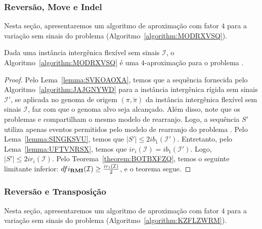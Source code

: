 \subsubsection{Reversão, Move e Indel}

Nesta seção, apresentaremos um algoritmo de aproximação com fator $4$ para a variação sem sinais do problema \SbFIRMI{} (Algoritmo~\ref{algorithm:MODRXVSQ}).



\begin{theorem}\label{theorem:BSLEJJVB}
Dada uma instância intergênica flexível sem sinais $\mathcal{I}$, o Algoritmo~\ref{algorithm:MODRXVSQ} é uma $4$-aproximação para o problema \SbFIRMI{}.
\end{theorem}
\begin{proof}
Pelo Lema~\ref{lemma:SVKOAOXA}, temos que a sequência fornecida pelo Algoritmo~\ref{algorithm:JAJGNYWD} para a instância intergênica rígida sem sinais $\mathcal{I'}$, se aplicada no genoma de origem $(\pi,\breve\pi)$ da instância intergênica flexível sem sinais $\mathcal{I}$, faz com que o genoma alvo seja alcançado. Além disso, note que os problemas \SbIRMI{} e \SbFIRMI{} compartilham o mesmo modelo de rearranjo. Logo, a sequência $S'$ utiliza apenas eventos permitidos pelo modelo de rearranjo do problema \SbFIRMI{}. Pelo Lema~\ref{lemma:SINGKSVU}, temos que $|S'| \le 2ib_1(\mathcal{I'})$. Entretanto, pelo Lema~\ref{lemma:UFTVNRSX}, temos que $ir_i(\mathcal{I}) = ib_1(\mathcal{I'})$. Logo, $|S'| \le 2ir_i(\mathcal{I})$. Pelo Teorema~\ref{theorem:BOTBXFZQ}, temos o seguinte limitante inferior: $dfi_{\textbf{RMI}}(\mathcal{I}) \ge \frac{ir_i(\mathcal{I})}{2}$, e o teorema segue.
\end{proof}

\subsubsection{Reversão e Transposição}

Nesta seção, apresentaremos um algoritmo de aproximação com fator $4$ para a variação sem sinais do problema \SbFIRT{} (Algoritmo~\ref{algorithm:KZFLZWRM}).



